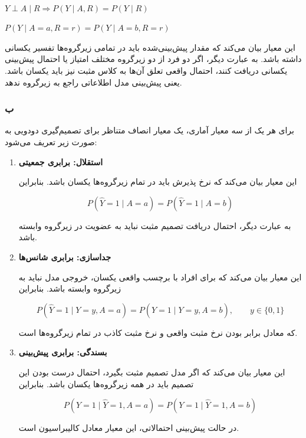 \begin{enumerate}
	\begin{latin}
		~\\
		$
		Y \perp A \mid R
		\Rightarrow
		P(Y\mid A,R)=P(Y\mid R)
		$
		
		$
		P(Y\mid A=a,R=r)=P(Y\mid A=b,R=r)
		$
	\end{latin}
	
	این معیار بیان می‌کند که مقدار پیش‌بینی‌شده باید در تمامی زیرگروه‌ها تفسیر یکسانی داشته باشد. به عبارت دیگر، اگر دو فرد از دو زیرگروه مختلف امتیاز یا احتمال پیش‌بینی یکسانی دریافت کنند، احتمال واقعی تعلق آن‌ها به کلاس مثبت نیز باید یکسان باشد. یعنی پیش‌بینی مدل اطلاعاتی راجع به زیرگروه ندهد.
\end{enumerate}

\subsubsection{ب}

برای هر یک از سه معیار آماری، یک معیار انصاف متناظر برای تصمیم‌گیری دودویی به صورت زیر تعریف می‌شود:

\begin{enumerate}
	\item \textbf{استقلال: برابری جمعیتی}
	
	این معیار بیان می‌کند که نرخ پذیرش باید در تمام زیرگروه‌ها یکسان باشد. بنابراین
	
	\begin{latin}
		\[
		P(\hat{Y}=1 \mid A=a)=P(\hat{Y}=1 \mid A=b)
		\]
	\end{latin}
	
	به عبارت دیگر، احتمال دریافت تصمیم مثبت نباید به عضویت در زیرگروه وابسته باشد.
	
	\item \textbf{جداسازی: برابری شانس‌ها}
	
	این معیار بیان می‌کند که برای افراد با برچسب واقعی یکسان، خروجی مدل نباید به زیرگروه وابسته باشد. بنابراین
	
	\begin{latin}
		\[
		P(\hat{Y}=1\mid Y=y,A=a)
		=
		P(\hat{Y}=1\mid Y=y,A=b),
		\qquad y\in\{0,1\}
		\]
	\end{latin}
	
	که معادل برابر بودن نرخ مثبت واقعی 
	و نرخ مثبت کاذب
	در تمام زیرگروه‌ها است.
	
	\item \textbf{بسندگی: برابری پیش‌بینی}
	
	این معیار بیان می‌کند که اگر مدل تصمیم مثبت بگیرد، احتمال درست بودن این تصمیم باید در همه زیرگروه‌ها یکسان باشد. بنابراین
	
	\begin{latin}
		\[
		P(Y=1\mid \hat{Y}=1,A=a)
		=
		P(Y=1\mid \hat{Y}=1,A=b)
		\]
	\end{latin}
	
	در حالت پیش‌بینی احتمالاتی، این معیار معادل کالیبراسیون است.
\end{enumerate}


